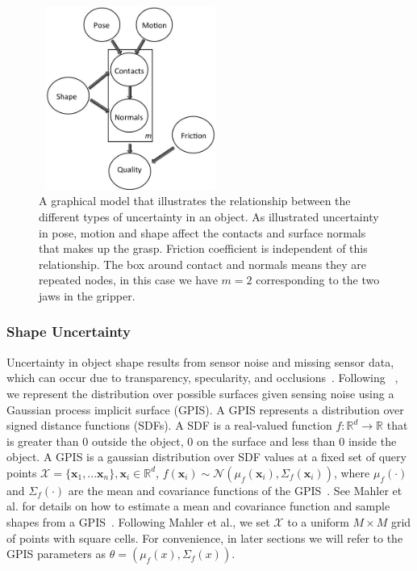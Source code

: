\documentclass[10pt, conference]{ieeeconf}      %
\newcommand{\bx}{\mathbf{x}}
\newcommand{\mX}{\mathcal{X}}
\newcommand{\mN}{\mathcal{N}}
\begin{document}
\begin{figure}[ht!]
\centering
\includegraphics[width = 6cm, height = 6cm]{figures/Graphical_Model.jpg}
\caption{A graphical model that illustrates the relationship between the different types of uncertainty in an object. As illustrated uncertainty in pose, motion and shape affect the contacts and surface normals that makes up the grasp. Friction coefficient is independent of this relationship. The box around contact and normals means they are repeated nodes, in this case we have $m=2$ corresponding to the two jaws in the gripper.  }
\vspace*{-10pt}
\label{fig:graphical_model}
\end{figure}

\subsubsection{Shape Uncertainty}

Uncertainty in object shape results from sensor noise and missing sensor data, which can occur due to transparency, specularity, and occlusions~\cite{mahler2015gp}.
Following ~\cite{mahler2015gp}, we represent the distribution over possible surfaces given sensing noise using a Gaussian process implicit surface (GPIS).
A GPIS represents a distribution over signed distance functions (SDFs).
A SDF is a real-valued function $f: \mathbb{R}^d \rightarrow \mathbb{R}$ that is greater than 0 outside the object, 0 on the surface and less than 0 inside the object.
A GPIS is a gaussian distribution over SDF values at a fixed set of query points $\mX = \{\bx_1, ... \bx_n\}, \bx_i \in \mathbb{R}^d$, $f(\bx_i) \sim \mN(\mu_{f}(\bx_i),\Sigma_{f}(\bx_i))$, where $\mu_{f}(\cdot)$ and $\Sigma_{f}(\cdot)$ are the mean and covariance functions of the GPIS~\cite{rasmussen2006}.
See Mahler et al. for details on how to estimate a mean and covariance function and sample shapes from a GPIS~\cite{mahler2015gp}.
Following Mahler et al., we set $\mX$ to a uniform $M \times M$ grid of points with square cells.
For convenience, in later sections we will refer to the GPIS parameters as $\theta = \left( \mu_{f}(x), \Sigma_{f}(x) \right)$. 
\end{document}
